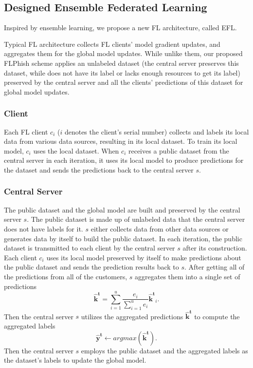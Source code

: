 \documentclass[lettersize,journal]{IEEEtran}
\begin{document}
\subsection{Designed Ensemble Federated Learning}
Inspired by ensemble learning, we propose a new FL architecture, called EFL.
\par Typical FL architecture collects FL clients' model gradient updates, and aggregates them for the global model updates. While unlike them, our proposed FLPhish scheme applies an unlabeled dataset (the central server preserves this dataset, while does not have its label or lacks enough resources to get its label) preserved by the central server and all the clients' predictions of this dataset for global model updates.
\subsubsection{{Client}} Each FL client {$c_{i}$} ($i$ denotes the client's serial number) collects and labels its local data from various data sources, resulting in its local dataset. To train its local model, {$c_{i}$} uses the local dataset. When {$c_{i}$} receives a public dataset from the central server in each iteration, it uses its local model to produce predictions for the dataset and sends the predictions back to the central server $s$.
\subsubsection{{Central Server}} The public dataset and the global model are built and preserved by the central server $s$. The public dataset is made up of unlabeled data that the central server does not have labels for it. $s$ either collects data from other data sources or generates data by itself to build the public dataset. In each iteration, the public dataset is transmitted to each client by the central server $s$ after its construction. Each client $c_i$ uses its local model preserved by itself to make predictions about the public dataset and sends the prediction results back to $s$. After getting all of the predictions from all of the customers, $s$ aggregates them into a single set of predictions
\begin{equation}
\mathbf{\hat{k}^t}=\sum_{i=1}^{u}\frac{e_i}{\sum_{i=1}^{u}e_i}\mathbf{\hat{k}^t}_i.
\end{equation}
Then the central server $s$ utilizes the aggregated predictions $\mathbf{\hat{k}^t}$ to compute the aggregated labels
\begin{equation}
\mathbf{\hat{y}^t}\gets argmax(\mathbf{\hat{k}^t}).
\end{equation} 
Then the central server {$s$} employs the public dataset and the aggregated labels as the dataset's labels to update the global model.
\end{document}
